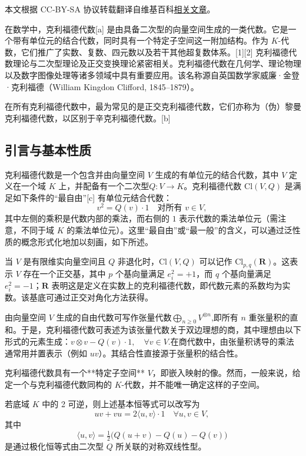 
本文根据 CC-BY-SA 协议转载翻译自维基百科\href{https://en.wikipedia.org/wiki/Clifford_algebra}{相关文章}。

在数学中，克利福德代数[a] 是由具备二次型的向量空间生成的一类代数。它是一个带有单位元的结合代数，同时具有一个特定子空间这一附加结构。作为 $K$-代数，它们推广了实数、复数、四元数以及若干其他超复数体系。[1][2] 克利福德代数理论与二次型理论及正交变换理论紧密相关。克利福德代数在几何学、理论物理以及数字图像处理等诸多领域中具有重要应用。该名称源自英国数学家威廉·金登·克利福德（William Kingdon Clifford, 1845–1879）。

在所有克利福德代数中，最为常见的是正交克利福德代数，它们亦称为（伪）黎曼克利福德代数，以区别于辛克利福德代数。[b]

\subsection{引言与基本性质}
克利福德代数是一个包含并由向量空间 $V$ 生成的有单位元的结合代数，其中 $V$ 定义在一个域 $K$ 上，并配备有一个二次型$Q: V \to K$。克利福德代数 $\mathrm{Cl}(V, Q)$ 是满足如下条件的“最自由”[c] 有单位元结合代数：
$$
v^{2} = Q(v) \cdot 1 \quad \text{对所有 } v \in V,~
$$
其中左侧的乘积是代数内部的乘法，而右侧的 $1$ 表示代数的乘法单位元（需注意，不同于域 $K$ 的乘法单位元）。这里“最自由”或“最一般”的含义，可以通过泛性质的概念形式化地加以刻画，如下所述。

当 $V$ 是有限维实向量空间且 $Q$ 非退化时，$\mathrm{Cl}(V, Q)$ 可以记作 $\mathrm{Cl}_{p,q}(\mathbf{R})$。这表示 $V$ 存在一个正交基，其中 $p$ 个基向量满足 $e_i^2 = +1$，而 $q$ 个基向量满足 $e_i^2 = -1$；$\mathbf{R}$ 表明这是定义在实数上的克利福德代数，即代数元素的系数均为实数。该基底可通过正交对角化方法获得。

由向量空间 $V$ 生成的自由代数可写作张量代数$\bigoplus_{n \geq 0} V^{\otimes n}$,即所有 $n$ 重张量积的直和。于是，克利福德代数可表述为该张量代数关于双边理想的商，其中理想由以下形式的元素生成：$v \otimes v - Q(v) \cdot 1, \quad \forall v \in V$.在商代数中，由张量积诱导的乘法通常用并置表示（例如 $uv$）。其结合性直接源于张量积的结合性。

克利福德代数具有一个**特定子空间** $V$，即嵌入映射的像。然而，一般来说，给定一个与克利福德代数同构的 $K$-代数，并不能唯一确定这样的子空间。

若底域 $K$ 中的 2 可逆，则上述基本恒等式可以改写为
$$
uv + vu = 2 \langle u, v \rangle \cdot 1 \quad \forall u, v \in V,~
$$
其中
$$
\langle u, v \rangle = \tfrac{1}{2}\big(Q(u+v) - Q(u) - Q(v)\big)~
$$
是通过极化恒等式由二次型 $Q$ 所关联的对称双线性型。

